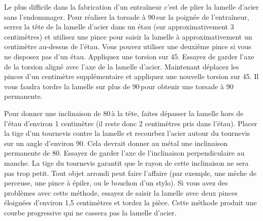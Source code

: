 \documentclass[a4paper,french,11pt,twoside]{report}
\begin{document}
Le plus difficile dans la fabrication d'un entraîneur c'est de plier la lamelle d'acier sans l'endommager. Pour réaliser la torsade à 90\textdegree{}\,sur la poignée de l'entraîneur, serrez la tête de la lamelle d'acier dans un étau (sur approximativement 3 centimètres) et utilisez une pince pour saisir la lamelle à approximativement un centimètre au-dessus de l'étau. Vous pouvez utiliser une deuxième pince si vous ne disposez pas d'un étau. Appliquez une torsion sur 45\textdegree{}. Essayez de garder l'axe de la torsion aligné avec l'axe de la lamelle d'acier. Maintenant déplacez les pinces d'un centimètre supplémentaire et appliquez une nouvelle torsion sur 45\textdegree{}. Il vous faudra tordre la lamelle sur plus de 90\textdegree{}\,pour obtenir une torsade à 90\textdegree{} permanente.

Pour donner une inclinaison de 80\textdegree{}\,à la tête, faites dépasser la lamelle hors de l'étau d'environ 1 centimètre (il reste donc 2 centimètres pris dans l'étau). Placer la tige d'un tournevis contre la lamelle et recourbez l'acier autour du tournevis sur un angle d'environ 90\textdegree{}. Cela devrait donner au métal une inclinaison permanente de 80\textdegree{}. Essayez de garder l'axe de l'inclinaison perpendiculaire au manche. La tige du tournevis garantit que le rayon de cette inclinaison ne sera pas trop petit. Tout objet arrondi peut faire l'affaire (par exemple, une mèche de perceuse, une pince à épiler, ou le bouchon d'un stylo). Si vous avez des problèmes avec cette méthode, essayez de saisir la lamelle avec deux pinces éloignées d'environ 1,5 centimètres et tordez la pièce. Cette méthode produit une courbe progressive qui ne cassera pas la lamelle d'acier.
\end{document}
